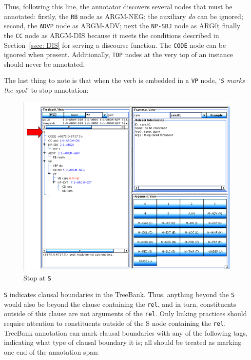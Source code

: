 \documentclass[11pt]{report}
\begin{document}
Thus, following this line, the annotator discovers several nodes that must be annotated: firstly, the \texttt{RB} node as ARGM-NEG; the auxiliary \textit{do} can be ignored; second, the \texttt{ADVP} node as ARGM-ADV; next the \texttt{NP-SBJ} node as ARG0; finally the \texttt{CC} node as ARGM-DIS because it meets the conditions described in Section~\ref{ssec: DIS} for serving a discourse function. The \texttt{CODE} node can be ignored when present.  Additionally, \texttt{TOP} nodes at the very top of an instance should never be annotated.  

The last thing to note is that when the verb is embedded in a \texttt{VP} node, `\textit{\texttt{S} marks the spot}' to stop annotation: 

\begin{figure}[htbp]
\centering
\includegraphics[scale=0.4]{img/SArrow.png}
\caption{Stop at \texttt{S}}
\label{fig:SArrow}
\end{figure}

\texttt{S} indicates clausal boundaries in the TreeBank. Thus, anything beyond the \texttt{S} would also be beyond the clause containing the \texttt{rel}, and in turn, constituents outside of this clause are not arguments of the \texttt{rel}. Only linking practices should require attention to constituents outside of the S node containing the \texttt{rel}. TreeBank annotation can mark clausal boundaries with any of the following tags, indicating what type of clausal boundary it is; all should be treated as marking one end of the annotation span: 
\end{document}
